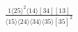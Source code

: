 \documentclass[varwidth, border=5pt]{standalone}
\begin{document}
\begin{my}
$\begin{gathered}
\scriptscriptstyle\frac{1⟨25⟩^2⟨14⟩[34][13]}{⟨15⟩⟨24⟩⟨34⟩⟨35⟩[35]^2}
\end{gathered}$
\end{my}
\end{document}
